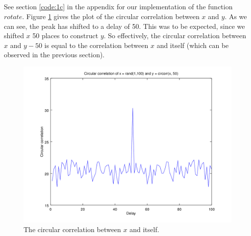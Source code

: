 \documentclass{article}
\begin{document}
\subsection{}
See section \ref{code:1c} in the appendix for our implementation of the function $rotate$. Figure \ref{fig:1c} gives the plot of the circular correlation between $x$ and $y$. As we can see, the peak has shifted to a delay of 50. This was to be expected, since we shifted $x$ 50 places to construct $y$. So effectively, the circular correlation between $x$ and $y-50$ is equal to the correlation between $x$ and itself (which can be observed in the previous section).
\begin{figure}[H]
	\centering
	\includegraphics[width=.7\textwidth]{plot1c.png}
	\caption{The circular correlation between $x$ and itself.}
	\label{fig:1c}
\end{figure}
\end{document}
